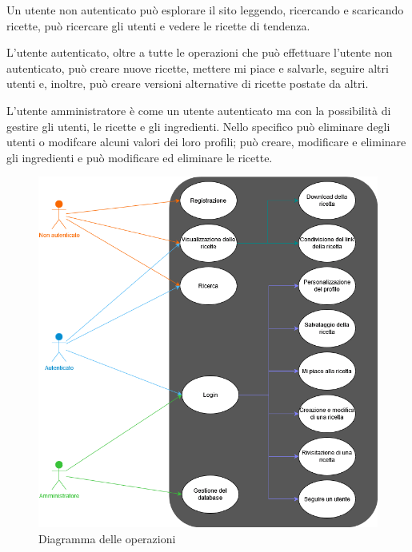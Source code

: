\documentclass[a4paper]{article}
\begin{document}
            Un utente non autenticato può esplorare il sito leggendo, ricercando e scaricando ricette, 
            può ricercare gli utenti e vedere le ricette di tendenza.
            
            L'utente autenticato, oltre a tutte le operazioni che può effettuare l'utente non autenticato,
            può creare nuove ricette, mettere mi piace e salvarle, seguire altri utenti e, inoltre, può         
            creare versioni alternative di ricette postate da altri.
            
            L'utente amministratore è come un utente autenticato ma con la possibilità di gestire gli utenti, 
            le ricette e gli ingredienti.
            Nello specifico può eliminare degli utenti o modifcare alcuni valori dei loro profili; 
            può creare, modificare e eliminare gli ingredienti e può modificare ed eliminare le ricette.
            
            \begin{figure}[ht]
                \centering
                \includegraphics[width=1\textwidth]{./pictures/diagramma_operazioni.png}
                \caption{Diagramma delle operazioni}
                \label{fig:diagramma_operazioni}
            \end{figure}
    
\end{document}
